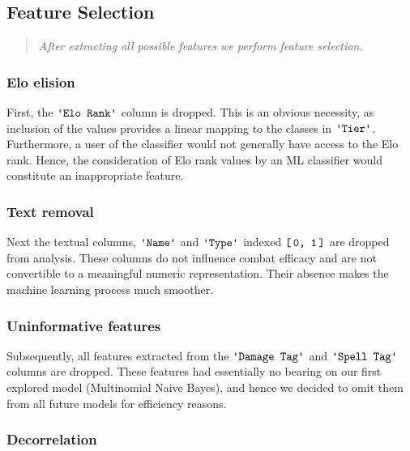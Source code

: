 \documentclass{article}
\newcommand{\Column}[1]{\ensuremath{\texttt{\textquotesingle{}#1\textquotesingle{}}}\xspace}
\newcommand{\IndexRange}[2]{\ensuremath{\texttt{{[}\,#1,\ #2\,{]}}}\xspace}
\begin{document}
\hypertarget{feature-selection}{%
\subsection{Feature Selection}\label{feature-selection}}

\begin{quote}
	{\itshape After extracting all possible features we perform feature selection.}
\end{quote}


\hypertarget{text-removal}{
\subsubsection{Elo elision}\label{elo-elision}}

First, the \Column{Elo Rank} column is dropped.
This is an obvious necessity, as inclusion of the values provides a linear mapping to the classes in \Column{Tier}.
Furthermore, a user of the classifier would not generally have access to the Elo rank.
Hence, the consideration of Elo rank values by an ML classifier would constitute an inappropriate feature.


\hypertarget{text-removal}{
\subsubsection{Text removal}\label{text-removal}}

Next the textual columns, \Column{Name} and \Column{Type} indexed \IndexRange{0}{1} are dropped from analysis.
These columns do not influence combat efficacy and are not convertible to a meaningful
numeric representation.
Their absence makes the machine learning process much smoother.


\hypertarget{uninformative-features}{
\subsubsection{Uninformative features}\label{uninformative-features}}

Subsequently,  all features extracted from the \Column{Damage Tag} and \Column{Spell Tag} columns are dropped.
These features had essentially no bearing on our first explored model (Multinomial Naive Bayes), and hence we decided to omit them from all future models for efficiency reasons.


\hypertarget{decorrelation}{
\subsubsection{Decorrelation}\label{decorrelation}}
\end{document}
